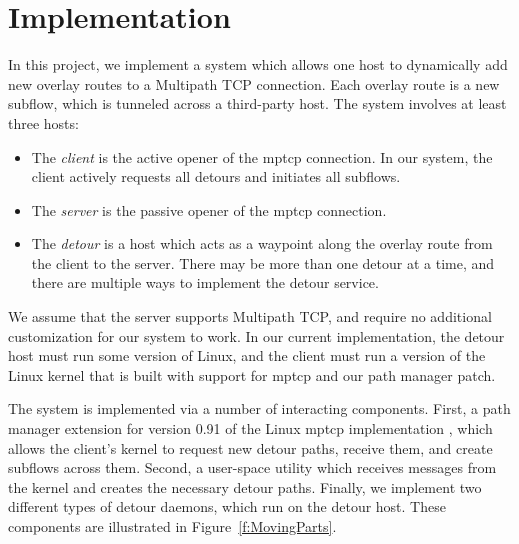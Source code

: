 \documentclass{cwru}
\begin{document}
\chapter{Implementation}
\label{c:impl}


In this project, we implement a system which allows one host to dynamically add
new overlay routes to a Multipath TCP connection. Each overlay route is a new
subflow, which is tunneled across a third-party host. The system involves at
least three hosts:
\begin{itemize}
\item The \emph{client} is the active opener of the \ac{mptcp} connection. In
  our system, the client actively requests all detours and initiates all
  subflows.
\item The \emph{server} is the passive opener of the \ac{mptcp} connection.
\item The \emph{detour} is a host which acts as a waypoint along the overlay
  route from the client to the server. There may be more than one detour at a
  time, and there are multiple ways to implement the detour service.
\end{itemize}

We assume that the server supports Multipath TCP, and require no additional
customization for our system to work. In our current implementation, the detour
host must run some version of Linux, and the client must run a version of the
Linux kernel that is built with support for \ac{mptcp} and our path manager
patch.

The system is implemented via a number of interacting components. First, a path
manager extension for version 0.91 of the Linux \ac{mptcp} implementation
\cite{mptcp}, which allows the client's kernel to request new detour paths,
receive them, and create subflows across them. Second, a user-space utility
which receives messages from the kernel and creates the necessary detour paths.
Finally, we implement two different types of detour daemons, which run on the
detour host. These components are illustrated in Figure~\ref{f:MovingParts}.
\end{document}
